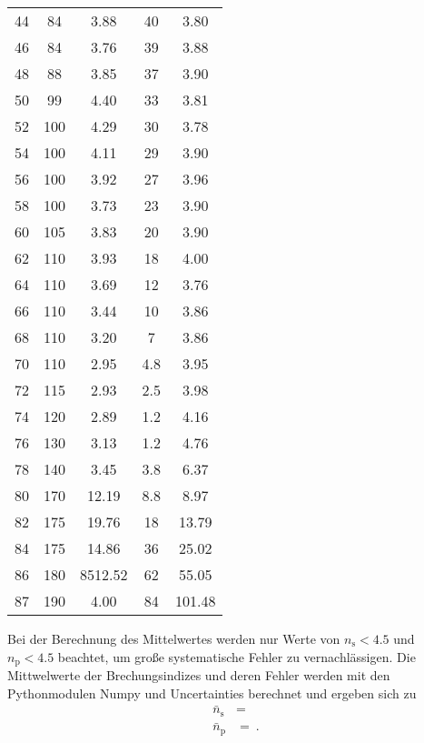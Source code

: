 \begin{table}[H]
\begin{tabular}{S[table-format=2.0] S S[table-format=4.2]S[table-format=2.1]S[table-format=3.2]}
    44 & 84  &  3.88    & 40 & 3.80 \\
    46 & 84  &  3.76    & 39 & 3.88 \\
    48 & 88  &  3.85    & 37 & 3.90 \\
    50 & 99  &  4.40    & 33 & 3.81 \\
    52 & 100 &  4.29    & 30 & 3.78\\
    54 & 100 &  4.11    & 29 & 3.90 \\
    56 & 100 &  3.92    & 27 & 3.96 \\
    58 & 100 &  3.73    & 23 & 3.90 \\
    60 & 105 &  3.83    & 20 & 3.90 \\
    62 & 110 &  3.93    & 18 & 4.00 \\
    64 & 110 &  3.69    & 12 & 3.76 \\
    66 & 110 &  3.44    & 10 & 3.86 \\
    68 & 110 &  3.20    &  7 & 3.86 \\
    70 & 110 &  2.95    &  4.8 & 3.95 \\
    72 & 115 &  2.93    &  2.5 & 3.98 \\
    74 & 120 &  2.89    &  1.2 & 4.16 \\
    76 & 130 &  3.13    &  1.2 & 4.76 \\
    78 & 140 &  3.45    &  3.8 & 6.37 \\
    80 & 170 &  12.19   &  8.8 & 8.97 \\
    82 & 175 &  19.76   & 18 & 13.79 \\
    84 & 175 &  14.86   & 36 & 25.02 \\
    86 & 180 &  8512.52 & 62 & 55.05 \\
    87 & 190 &  4.00    & 84 & 101.48 \\
   \bottomrule 
  \end{tabular}
\end{table}


Bei der Berechnung des Mittelwertes werden nur Werte von $n_{\text{s}}<4.5$ und $n_{\text{p}}<4.5$
beachtet, um große systematische Fehler zu vernachlässigen.
Die Mittwelwerte der Brechungsindizes und deren Fehler werden mit den Pythonmodulen Numpy \cite{numpy} und Uncertainties \cite{uncertainties} berechnet
und ergeben sich zu
\begin{align*}
  \bar{n}_{\text{s}}&=\qty{}{} \\
  \bar{n}_{\text{p}}&=\qty{}{}.
\end{align*}


